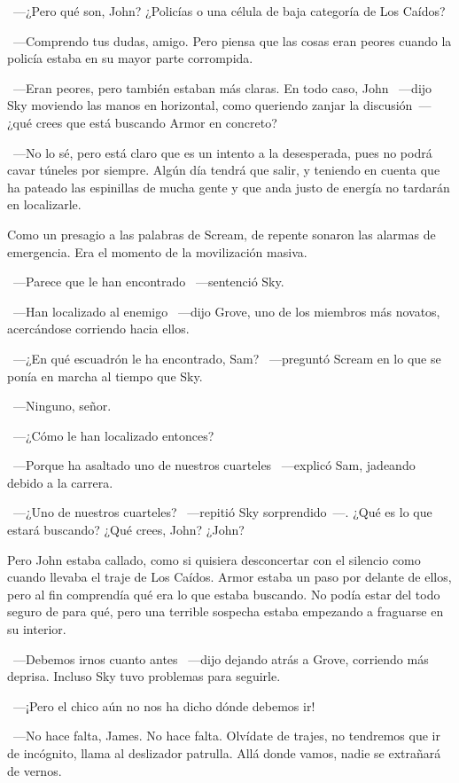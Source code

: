 ~---¿Pero qué son, John? ¿Policías o una célula de baja categoría de Los Caídos?

~---Comprendo tus dudas, amigo. Pero piensa que las cosas eran peores cuando la policía estaba en su mayor parte corrompida.

~---Eran peores, pero también estaban más claras. En todo caso, John ~---dijo Sky moviendo las manos en horizontal, como queriendo zanjar la discusión~--- ¿qué crees que está buscando Armor en concreto?

~---No lo sé, pero está claro que es un intento a la desesperada, pues no podrá cavar túneles por siempre. Algún día tendrá que salir, y teniendo en cuenta que ha pateado las espinillas de mucha gente y que anda justo de energía no tardarán en localizarle.

Como un presagio a las palabras de Scream, de repente sonaron las alarmas de emergencia. Era el momento de la movilización masiva.

~---Parece que le han encontrado ~---sentenció Sky.

~---Han localizado al enemigo ~---dijo Grove, uno de los miembros más novatos, acercándose corriendo hacia ellos.

~---¿En qué escuadrón le ha encontrado, Sam? ~---preguntó Scream en lo que se ponía en marcha al tiempo que Sky.

~---Ninguno, señor.

~---¿Cómo le han localizado entonces?

~---Porque ha asaltado uno de nuestros cuarteles ~---explicó Sam, jadeando debido a la carrera.

~---¿Uno de nuestros cuarteles? ~---repitió Sky sorprendido~---. ¿Qué es lo que estará buscando? ¿Qué crees, John? ¿John?

Pero John estaba callado, como si quisiera desconcertar con el silencio como cuando llevaba el traje de Los Caídos. Armor estaba un paso por delante de ellos, pero al fin comprendía qué era lo que estaba buscando. No podía estar del todo seguro de para qué, pero una terrible sospecha estaba empezando a fraguarse en su interior.

~---Debemos irnos cuanto antes ~---dijo dejando atrás a Grove, corriendo más deprisa. Incluso Sky tuvo problemas para seguirle.

~---¡Pero el chico aún no nos ha dicho dónde debemos ir!

~---No hace falta, James. No hace falta. Olvídate de trajes, no tendremos que ir de incógnito, llama al deslizador patrulla. Allá donde vamos, nadie se extrañará de vernos.

